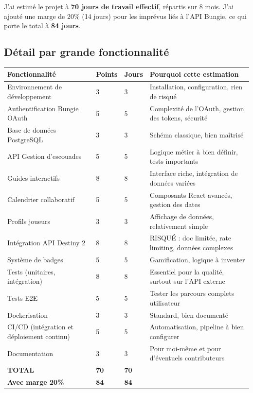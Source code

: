 J'ai estimé le projet à \textbf{70 jours de travail effectif}, répartis sur 8 mois. J'ai ajouté une marge de 20\% (14 jours) pour les imprévus liés à l'API Bungie, ce qui porte le total à \textbf{84 jours}.

\subsection{Détail par grande fonctionnalité}

\begin{longtable}{|p{4cm}|p{2cm}|p{2cm}|p{4cm}|}
\hline
\textbf{Fonctionnalité} & \textbf{Points} & \textbf{Jours} & \textbf{Pourquoi cette estimation} \\
\hline
Environnement de développement & 3 & 3 & Installation, configuration, rien de risqué \\
\hline
Authentification Bungie OAuth & 5 & 5 & Complexité de l'OAuth, gestion des tokens, sécurité \\
\hline
Base de données PostgreSQL & 3 & 3 & Schéma classique, bien maîtrisé \\
\hline
API Gestion d'escouades & 5 & 5 & Logique métier à bien définir, tests importants \\
\hline
Guides interactifs & 8 & 8 & Interface riche, intégration de données variées \\
\hline
Calendrier collaboratif & 5 & 5 & Composants React avancés, gestion des dates \\
\hline
Profils joueurs & 3 & 3 & Affichage de données, relativement simple \\
\hline
Intégration API Destiny 2 & 8 & 8 & RISQUÉ : doc limitée, rate limiting, données complexes \\
\hline
Système de badges & 5 & 5 & Gamification, logique à inventer \\
\hline
Tests (unitaires, intégration) & 8 & 8 & Essentiel pour la qualité, surtout sur l'API externe \\
\hline
Tests E2E & 5 & 5 & Tester les parcours complets utilisateur \\
\hline
Dockerisation & 3 & 3 & Standard, bien documenté \\
\hline
CI/CD (intégration et déploiement continu) & 5 & 5 & Automatisation, pipeline à bien configurer \\
\hline
Documentation & 3 & 3 & Pour moi-même et pour d'éventuels contributeurs \\
\hline
\textbf{TOTAL} & \textbf{70} & \textbf{70} & \\
\hline
\textbf{Avec marge 20\%} & \textbf{84} & \textbf{84} & \\
\hline
\end{longtable}


